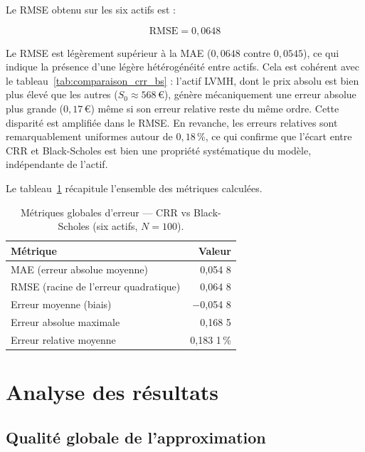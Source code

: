 \documentclass[11pt]{report}
\begin{document}
\medskip

Le RMSE obtenu sur les six actifs est :

\begin{equation}
    \text{RMSE} = 0{,}0648
\end{equation}

Le RMSE est légèrement supérieur à la MAE ($0{,}0648$ contre $0{,}0545$),
ce qui indique la présence d'une légère hétérogénéité entre actifs. Cela
est cohérent avec le tableau~\ref{tab:comparaison_crr_bs} : l'actif LVMH,
dont le prix absolu est bien plus élevé que les autres ($S_0 \approx 568$\,€),
génère mécaniquement une erreur absolue plus grande ($0{,}17$\,€) même
si son erreur relative reste du même ordre. Cette disparité est amplifiée
dans le RMSE. En revanche, les erreurs relatives sont remarquablement
uniformes autour de $0{,}18\,\%$, ce qui confirme que l'écart entre CRR
et Black-Scholes est bien une propriété systématique du modèle, indépendante
de l'actif.

\medskip

Le tableau~\ref{tab:metriques_globales} récapitule l'ensemble des métriques
calculées.

\begin{table}[H]
\centering
\caption{Métriques globales d'erreur — CRR vs Black-Scholes (six actifs,
$N=100$).}
\label{tab:metriques_globales}
\begin{tabular}{lr}
\toprule
Métrique & Valeur \\
\midrule
MAE (erreur absolue moyenne)        & 0,054 8 \\
RMSE (racine de l'erreur quadratique) & 0,064 8 \\
Erreur moyenne (biais)              & $-$0,054 8 \\
Erreur absolue maximale             & 0,168 5 \\
Erreur relative moyenne             & 0,183 1\,\% \\
\bottomrule
\end{tabular}
\end{table}

\section{Analyse des résultats}

\subsection{Qualité globale de l'approximation}
\end{document}
